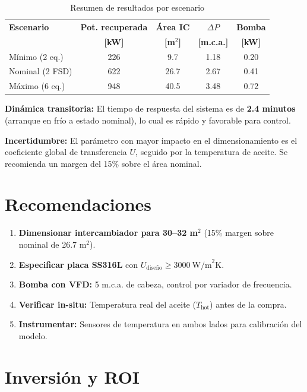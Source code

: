 \documentclass[11pt,a4paper]{article}
\begin{document}
\begin{table}[H]
\centering
\caption{Resumen de resultados por escenario}
\begin{tabular}{@{}lcccc@{}}
\toprule
\textbf{Escenario} & \textbf{Pot. recuperada} & \textbf{Área IC} & \textbf{$\Delta P$} & \textbf{Bomba} \\
 & \textbf{[kW]} & \textbf{[m$^2$]} & \textbf{[m.c.a.]} & \textbf{[kW]} \\
\midrule
Mínimo (2 eq.) & 226 & 9.7 & 1.18 & 0.20 \\
Nominal (2 FSD) & 622 & 26.7 & 2.67 & 0.41 \\
Máximo (6 eq.) & 948 & 40.5 & 3.48 & 0.72 \\
\bottomrule
\end{tabular}
\end{table}

\textbf{Dinámica transitoria:} El tiempo de respuesta del sistema es de \textbf{2.4 minutos} (arranque en frío a estado nominal), lo cual es rápido y favorable para control.

\textbf{Incertidumbre:} El parámetro con mayor impacto en el dimensionamiento es el coeficiente global de transferencia $U$, seguido por la temperatura de aceite. Se recomienda un margen del 15\% sobre el área nominal.

\section{Recomendaciones}

\begin{enumerate}
  \item \textbf{Dimensionar intercambiador para 30--32 m$^2$} (15\% margen sobre nominal de 26.7 m$^2$).
  \item \textbf{Especificar placa SS316L} con $U_{\text{diseño}} \geq 3000\ \text{W/m}^2\text{K}$.
  \item \textbf{Bomba con VFD:} 5 m.c.a. de cabeza, control por variador de frecuencia.
  \item \textbf{Verificar in-situ:} Temperatura real del aceite ($T_{\text{hot}}$) antes de la compra.
  \item \textbf{Instrumentar:} Sensores de temperatura en ambos lados para calibración del modelo.
\end{enumerate}

\section{Inversión y ROI}
\end{document}
